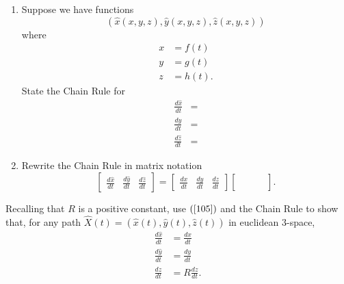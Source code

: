 \documentclass{ximera}
\begin{document}
\begin{problem}\hfil
\begin{enumerate}
\item Suppose we have functions%
\[
\left(  \hat{x}\left(  x,y,z\right)  ,\hat{y}\left(  x,y,z\right)  ,\hat
{z}\left(  x,y,z\right)  \right)
\]
where%
\begin{align*}
x  &  =f\left(  t\right) \\
y  &  =g\left(  t\right) \\
z  &  =h\left(  t\right)  .
\end{align*}
State the Chain Rule for%
\begin{align*}
\frac{d\hat{x}}{dt}  &  =\\
\frac{d\hat{y}}{dt}  &  =\\
\frac{d\hat{z}}{dt}  &  =
\end{align*}


\item Rewrite the Chain Rule in matrix notation%
\[
\begin{bmatrix}
\frac{d\hat{x}}{dt} & \frac{d\hat{y}}{dt} & \frac{d\hat{z}}{dt}%
\end{bmatrix}
=
\begin{bmatrix}
\frac{dx}{dt} & \frac{dy}{dt} & \frac{dz}{dt}%
\end{bmatrix}
\begin{bmatrix}
&  & & \\
&  & & \\
&  & & \\
&  &
\end{bmatrix}.
\]
\end{enumerate}
\end{problem}

\begin{problem}
\label{8} Recalling that $R$ is a positive constant, use $\left(
\ref{105}\right)  $ and the Chain Rule to show that, for any path $\hat
{X}\left(  t\right)  =\left(  \hat{x}\left(  t\right)  ,\hat{y}\left(
t\right)  ,\hat{z}\left(  t\right)  \right)  $ in euclidean $3$-space,%
\begin{align*}
\frac{d\hat{x}}{dt}  &  =\frac{dx}{dt}\\
\frac{d\hat{y}}{dt}  &  =\frac{dy}{dt}\\
\frac{d\hat{z}}{dt}  &  =R\frac{dz}{dt}.
\end{align*}

\end{problem}
\end{document}
